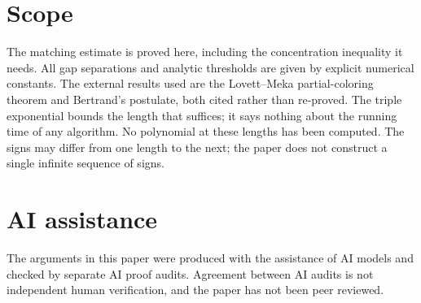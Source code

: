 \documentclass[11pt]{article}
\theoremstyle{remark}
\begin{document}
\section*{Scope}

The matching estimate is proved here, including the concentration
inequality it needs. All gap separations and analytic thresholds are given
by explicit numerical constants. The external results used are the
Lovett--Meka partial-coloring theorem and Bertrand's postulate, both cited
rather than re-proved. The triple exponential bounds the length
that suffices; it says nothing about the running time of any algorithm.
No polynomial at these lengths has been computed. The signs may differ from
one length to the next; the paper does not construct a single infinite
sequence of signs.

\section*{AI assistance}

The arguments in this paper were produced with the assistance of AI models
and checked by separate AI proof audits. Agreement between AI audits is not
independent human verification, and the paper has not been peer reviewed.
\end{document}
